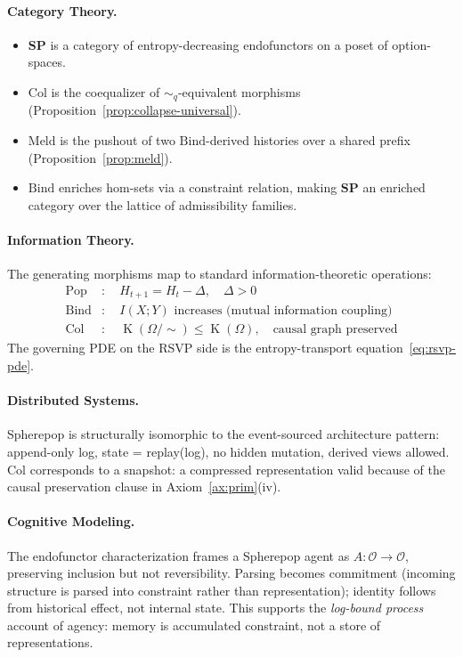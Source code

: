 \documentclass[12pt, a4paper]{article}
\theoremstyle{definition}
\theoremstyle{remark}
\newcommand{\Ent}{H}
\newcommand{\SP}{\mathbf{SP}}
\newcommand{\catO}{\mathcal{O}}
\newcommand{\Pop}{\mathrm{Pop}}
\newcommand{\Bind}{\mathrm{Bind}}
\newcommand{\Collapse}{\mathrm{Col}}
\newcommand{\Meld}{\mathrm{Meld}}
\DeclareMathOperator{\Kc}{K}
\begin{document}
\paragraph{Category Theory.}
\begin{itemize}
  \item $\SP$ is a category of entropy-decreasing endofunctors on a poset of
    option-spaces.
  \item $\Collapse$ is the coequalizer of $\sim_q$-equivalent morphisms
    (Proposition~\ref{prop:collapse-universal}).
  \item $\Meld$ is the pushout of two $\Bind$-derived histories over a shared prefix
    (Proposition~\ref{prop:meld}).
  \item $\Bind$ enriches hom-sets via a constraint relation, making $\SP$ an enriched
    category over the lattice of admissibility families.
\end{itemize}

\paragraph{Information Theory.}
The generating morphisms map to standard information-theoretic operations:
\begin{align}
  \Pop &: \quad \Ent_{t+1} = \Ent_t - \Delta, \quad \Delta > 0 \label{eq:pop-it}\\
  \Bind &: \quad I(X;Y) \text{ increases (mutual information coupling)} \label{eq:bind-it}\\
  \Collapse &: \quad \Kc(\Omega/{\sim}) \le \Kc(\Omega),
  \quad \text{causal graph preserved} \label{eq:col-it}
\end{align}
The governing PDE on the RSVP side is the entropy-transport equation~\eqref{eq:rsvp-pde}.

\paragraph{Distributed Systems.}
Spherepop is structurally isomorphic to the event-sourced architecture pattern: append-only log, state = replay(log), no hidden mutation,
derived views allowed. $\Collapse$ corresponds to a snapshot: a compressed
representation valid because of the causal preservation clause in
Axiom~\ref{ax:prim}(iv).

\paragraph{Cognitive Modeling.}
The endofunctor characterization frames a Spherepop agent as
$A : \catO \to \catO$, preserving inclusion but not reversibility. Parsing becomes
commitment (incoming structure is parsed into constraint rather than representation);
identity follows from historical effect, not internal state. This supports the
\emph{log-bound process} account of agency: memory is accumulated constraint, not a
store of representations.
\end{document}
